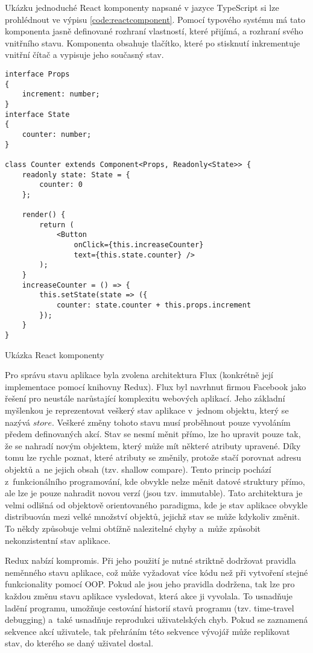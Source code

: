 Ukázku jednoduché React komponenty napsané v jazyce TypeScript si lze prohlédnout ve výpisu \ref{code:reactcomponent}. Pomocí typového systému má tato komponenta jasně definované rozhraní vlastností, které přijímá, a rozhraní svého vnitřního stavu. Komponenta obsahuje tlačítko, které po stisknutí inkrementuje vnitřní čítač a vypisuje jeho současný stav.

\begin{listing}
\begin{verbatim}
interface Props
{
    increment: number;
}
interface State
{
    counter: number;
}

class Counter extends Component<Props, Readonly<State>> {
    readonly state: State = {
        counter: 0
    };

    render() {
        return (
            <Button
                onClick={this.increaseCounter}
                text={this.state.counter} />
        );
    }
    increaseCounter = () => {
        this.setState(state => ({
            counter: state.counter + this.props.increment
        });
    }
}
\end{verbatim}
\caption{Ukázka React komponenty}
\label{code:reactcomponent}
\end{listing}

Pro správu stavu aplikace byla zvolena architektura Flux (konkrétně její implementace pomocí knihovny Redux). Flux byl navrhnut firmou Facebook jako řešení pro neustále narůstající komplexitu webových aplikací. Jeho základní myšlenkou je reprezentovat veškerý stav aplikace v~jednom objektu, který se nazývá $store$. Veškeré změny tohoto stavu musí proběhnout pouze vyvoláním předem definovaných akcí. Stav se nesmí měnit přímo, lze ho upravit pouze tak, že se nahradí novým objektem, který může mít některé atributy upravené. Díky tomu lze rychle poznat, které atributy se změnily, protože stačí porovnat adresu objektů a~ne jejich obsah (tzv. shallow compare). Tento princip pochází z~funkcionálního programování, kde obvykle nelze měnit datové struktury přímo, ale lze je pouze nahradit novou verzí (jsou tzv. immutable). Tato architektura je velmi odlišná od objektově orientovaného paradigma, kde je stav aplikace obvykle distribuován mezi velké množství objektů, jejichž stav se může kdykoliv změnit. To někdy způsobuje velmi obtížně nalezitelné chyby a~může způsobit nekonzistentní stav aplikace.

Redux nabízí kompromis. Při jeho použití je nutné striktně dodržovat pravidla neměnného stavu aplikace, což může vyžadovat více kódu než při vytvoření stejné funkcionality pomocí OOP. Pokud ale jsou jeho pravidla dodržena, tak lze pro každou změnu stavu aplikace vysledovat, která akce ji vyvolala. To usnadňuje ladění programu, umožňuje cestování historií stavů programu (tzv. time-travel debugging) a~také usnadňuje reprodukci uživatelských chyb. Pokud se zaznamená sekvence akcí uživatele, tak přehráním této sekvence vývojář může replikovat stav, do kterého se daný uživatel dostal. 

